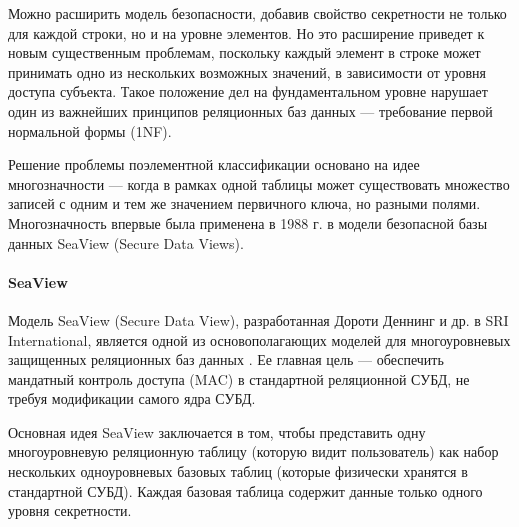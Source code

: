 Можно расширить модель безопасности, добавив свойство секретности не только для каждой строки, но и на уровне элементов. Но это расширение приведет к новым существенным проблемам, поскольку каждый элемент в строке может принимать одно из нескольких возможных значений, в зависимости от уровня доступа субъекта. Такое положение дел на фундаментальном уровне нарушает один из важнейших принципов реляционных баз данных --- требование первой нормальной формы (1NF)\footnotemark.


Решение проблемы поэлементной классификации основано на идее многозначности ---  когда в рамках одной таблицы может существовать множество записей с одним и тем же значением первичного ключа, но разными полями.  Многозначность впервые была применена в 1988 г. в модели безопасной базы данных SeaView (Secure Data Views).

\paragraph{SeaView}
Модель SeaView (Secure Data View), разработанная Дороти Деннинг и др. в SRI International, является одной из основополагающих моделей для многоуровневых защищенных реляционных баз данных \autocite{denning1987seaview}. Ее главная цель --- обеспечить мандатный контроль доступа (MAC) в стандартной реляционной СУБД, не требуя модификации самого ядра СУБД.

Основная идея SeaView заключается в том, чтобы представить одну многоуровневую реляционную таблицу (которую видит пользователь) как набор нескольких одноуровневых базовых таблиц (которые физически хранятся в стандартной СУБД). Каждая базовая таблица содержит данные только одного уровня секретности.

